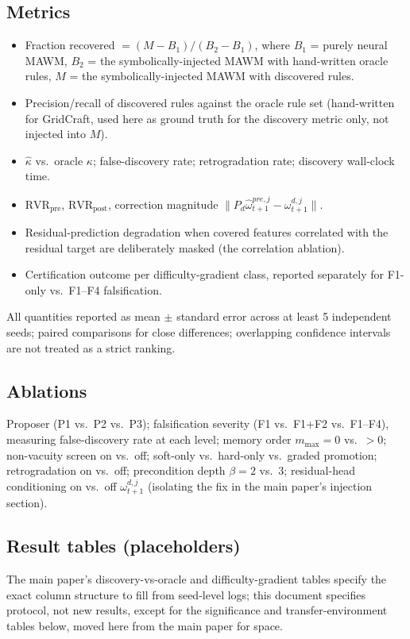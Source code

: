 \documentclass[11pt]{article}
\theoremstyle{plain}
\theoremstyle{definition}
\theoremstyle{remark}
\begin{document}
\subsection{Metrics}
\begin{itemize}
  \item Fraction recovered $=(M-B_1)/(B_2-B_1)$, where $B_1$ = purely neural MAWM, $B_2$ = the symbolically-injected MAWM with hand-written oracle rules, $M$ = the symbolically-injected MAWM with discovered rules.
  \item Precision/recall of discovered rules against the oracle rule set (hand-written for GridCraft, used here as ground truth for the discovery metric only, not injected into $M$).
  \item $\hat\kappa$ vs.\ oracle $\kappa$; false-discovery rate; retrogradation rate; discovery wall-clock time.
  \item $\mathrm{RVR}_{\mathrm{pre}}$, $\mathrm{RVR}_{\mathrm{post}}$, correction magnitude $\|P_d\hat\omega^{pre,j}_{t+1}-\omega^{d,j}_{t+1}\|$.
  \item Residual-prediction degradation when covered features correlated with the residual target are deliberately masked (the correlation ablation).
  \item Certification outcome per difficulty-gradient class, reported separately for F1-only vs.\ F1--F4 falsification.
\end{itemize}
All quantities reported as mean $\pm$ standard error across at least 5 independent seeds; paired comparisons for close differences; overlapping confidence intervals are not treated as a strict ranking.

\subsection{Ablations}
Proposer (P1 vs.\ P2 vs.\ P3); falsification severity (F1 vs.\ F1+F2 vs.\ F1--F4), measuring false-discovery rate at each level; memory order $m_{\max}=0$ vs.\ $>0$; non-vacuity screen on vs.\ off; soft-only vs.\ hard-only vs.\ graded promotion; retrogradation on vs.\ off; precondition depth $\beta=2$ vs.\ $3$; residual-head conditioning on vs.\ off $\omega^{d,j}_{t+1}$ (isolating the fix in the main paper's injection section).

\subsection{Result tables (placeholders)}
The main paper's discovery-vs-oracle and difficulty-gradient tables specify the exact column structure to fill from seed-level logs; this document specifies protocol, not new results, except for the significance and transfer-environment tables below, moved here from the main paper for space.
\end{document}
